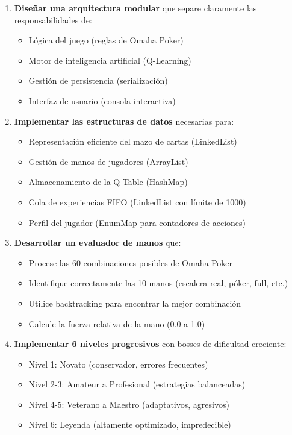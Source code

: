 \documentclass[12pt,a4paper]{article}
\begin{document}
\begin{enumerate}
    \item \textbf{Diseñar una arquitectura modular} que separe claramente las responsabilidades de:
    \begin{itemize}
        \item Lógica del juego (reglas de Omaha Poker)
        \item Motor de inteligencia artificial (Q-Learning)
        \item Gestión de persistencia (serialización)
        \item Interfaz de usuario (consola interactiva)
    \end{itemize}
    
    \item \textbf{Implementar las estructuras de datos} necesarias para:
    \begin{itemize}
        \item Representación eficiente del mazo de cartas (LinkedList)
        \item Gestión de manos de jugadores (ArrayList)
        \item Almacenamiento de la Q-Table (HashMap)
        \item Cola de experiencias FIFO (LinkedList con límite de 1000)
        \item Perfil del jugador (EnumMap para contadores de acciones)
    \end{itemize}
    
    \item \textbf{Desarrollar un evaluador de manos} que:
    \begin{itemize}
        \item Procese las 60 combinaciones posibles de Omaha Poker
        \item Identifique correctamente las 10 manos (escalera real, póker, full, etc.)
        \item Utilice backtracking para encontrar la mejor combinación
        \item Calcule la fuerza relativa de la mano (0.0 a 1.0)
    \end{itemize}
    
    \item \textbf{Implementar 6 niveles progresivos} con bosses de dificultad creciente:
    \begin{itemize}
        \item Nivel 1: Novato (conservador, errores frecuentes)
        \item Nivel 2-3: Amateur a Profesional (estrategias balanceadas)
        \item Nivel 4-5: Veterano a Maestro (adaptativos, agresivos)
        \item Nivel 6: Leyenda (altamente optimizado, impredecible)
    \end{itemize}
\end{enumerate}
\end{document}
